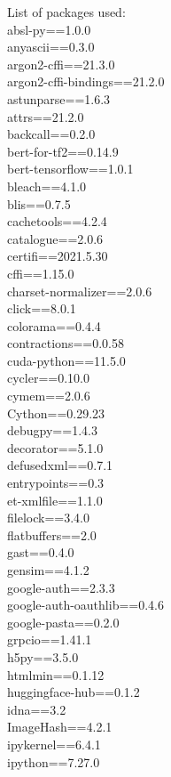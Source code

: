 \documentclass[11pt, a4paper]{article}
\begin{document}
List of packages used:\\
absl-py==1.0.0\\
anyascii==0.3.0\\
argon2-cffi==21.3.0\\
argon2-cffi-bindings==21.2.0\\
astunparse==1.6.3\\
attrs==21.2.0\\
backcall==0.2.0\\
bert-for-tf2==0.14.9\\
bert-tensorflow==1.0.1\\
bleach==4.1.0\\
blis==0.7.5\\
cachetools==4.2.4\\
catalogue==2.0.6\\
certifi==2021.5.30\\
cffi==1.15.0\\
charset-normalizer==2.0.6\\
click==8.0.1\\
colorama==0.4.4\\
contractions==0.0.58\\
cuda-python==11.5.0\\
cycler==0.10.0\\
cymem==2.0.6\\
Cython==0.29.23\\
debugpy==1.4.3\\
decorator==5.1.0\\
defusedxml==0.7.1\\
entrypoints==0.3\\
et-xmlfile==1.1.0\\
filelock==3.4.0\\
flatbuffers==2.0\\
gast==0.4.0\\
gensim==4.1.2\\
google-auth==2.3.3\\
google-auth-oauthlib==0.4.6\\
google-pasta==0.2.0\\
grpcio==1.41.1\\
h5py==3.5.0\\
htmlmin==0.1.12\\
huggingface-hub==0.1.2\\
idna==3.2\\
ImageHash==4.2.1\\
ipykernel==6.4.1\\
ipython==7.27.0\\
\end{document}
